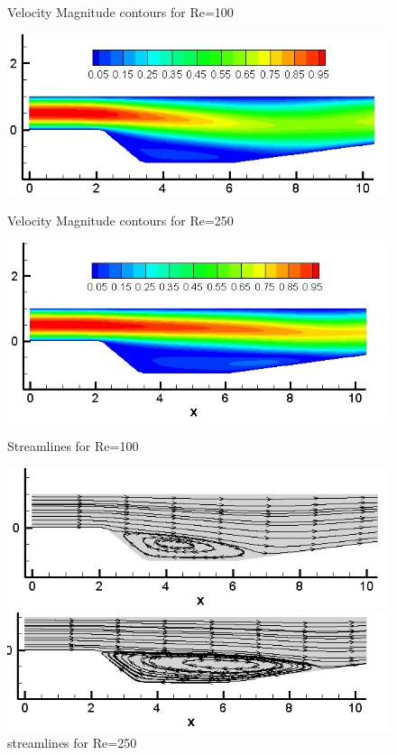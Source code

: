 \documentclass[12pt]{elsarticle}
\begin{document}
	\begin{figure}[h]
		\caption{Velocity Magnitude contours for Re=100}
		\centering\includegraphics[width=0.7\linewidth]{43_grid3_umag_100}
		\caption{Velocity Magnitude contours for Re=250}
		\centering\includegraphics[width=0.7\linewidth]{44_grid3_umag_re_250}
		\caption{Streamlines for Re=100}
		\centering\includegraphics[width=0.7\linewidth]{45_grid3_streamlines_100}
		\caption{streamlines for Re=250}
		\centering\includegraphics[width=0.7\linewidth]{46_grid3_streamlines_250}
	\end{figure}
	
\end{document}
